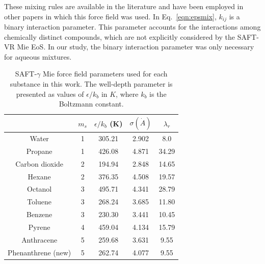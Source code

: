 \documentclass[final,12p,times,twocolumn]{elsarticle}
\begin{document}
	These mixing rules are available in the literature and have been employed in other papers in which this force field was used. In Eq.~\eqref{eqn:epsmix}, $k_{ij}$ is a binary interaction parameter. This parameter accounts for the interactions among chemically distinct compounds, which are not explicitly considered by the SAFT-VR Mie EoS. In our study, the binary interaction parameter was only necessary for aqueous mixtures.

	\begin{table}[h]
		\centering
		\caption{SAFT-$\gamma$ Mie force field parameters used for each substance in this work. The well-depth parameter is presented as values of $\epsilon/k_b$ in $K$, where $k_b$ is the Boltzmann constant.}
		\label{tbl:parameters}
		\begin{tabular}{ccccc}
			\hline\hline
			& $m_s$ & $\epsilon/k_{b}$ (K) & $\sigma (\dot{A})$ & $\lambda_r$ \\ \hline
			Water \cite{lobanova2016}        & 1     & 305.21               & 2.902              & 8.0         \\
			Propane \cite{herdes2015}        & 1     & 426.08               & 4.871              & 34.29       \\
			Carbon dioxide \cite{herdes2015} & 2     & 194.94               & 2.848              & 14.65       \\
			Hexane \cite{herdes2015}         & 2     & 376.35               & 4.508              & 19.57       \\
			Octanol \cite{ervik2016}         & 3     & 495.71               & 4.341              & 28.79       \\
			Toluene \cite{muller2017}        & 3     & 268.24               & 3.685              & 11.80       \\
			Benzene \cite{muller2017}        & 3     & 230.30               & 3.441              & 10.45       \\
			Pyrene \cite{muller2017}         & 4     & 459.04               & 4.134              & 15.79       \\
			Anthracene \cite{muller2017}     & 5     & 259.68               & 3.631              & 9.55        \\
			Phenanthrene (new)               & 5     & 262.74               & 4.077              & 9.55        \\ \hline\hline
		\end{tabular}
		
	\end{table}
\end{document}
